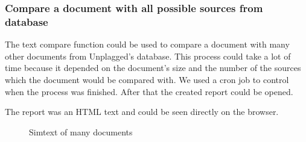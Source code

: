 \subsubsection{Compare a document with all possible sources from database}

The text compare function could be used to compare a document with many other documents from Unplagged's database. This process could take a lot of time because it depended on the document's size and the number of the sources which the document would be compared with.
We used a cron job to control when the process was finished. After that the created report could be opened.

The report was an HTML text and could be seen directly on the browser.

\begin{figure}[!h]
  \centering
  \caption{Simtext of many documents}
  \label{fig:Simtext of many documents}
\end{figure}